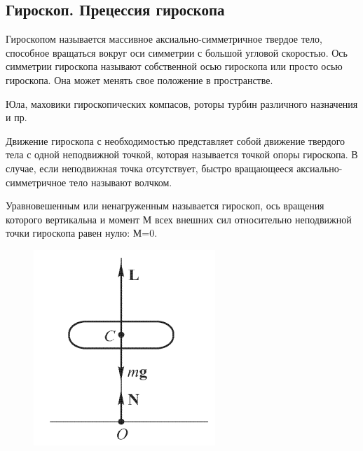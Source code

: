 \subsection{Гироскоп. Прецессия гироскопа}

\begin{definition}
    Гироскопом называется массивное аксиально-симметричное 
твердое тело, способное вращаться вокруг оси симметрии с
большой угловой скоростью. Ось симметрии гироскопа
называют собственной осью гироскопа или просто осью
гироскопа. Она может менять свое положение в пространстве.
\end{definition}

\begin{example}
    Юла, маховики гироскопических
компасов, роторы турбин различного назначения и пр.
\end{example}

\begin{definition}
    Движение гироскопа с необходимостью представляет собой
движение твердого тела с одной неподвижной точкой,
которая называется точкой опоры гироскопа.
В случае, если неподвижная точка отсутствует, быстро
вращающееся аксиально-симметричное тело называют
волчком.
\end{definition}

\begin{definition}
    Уравновешенным или ненагруженным называется гироскоп, ось 
вращения которого вертикальна и момент М всех внешних сил 
относительно неподвижной точки гироскопа равен нулю: М=0.
\end{definition}

\begin{figure}
    \centering
    \includegraphics[width=\linewidth]{imgs/q12i1.png}
\end{figure}

